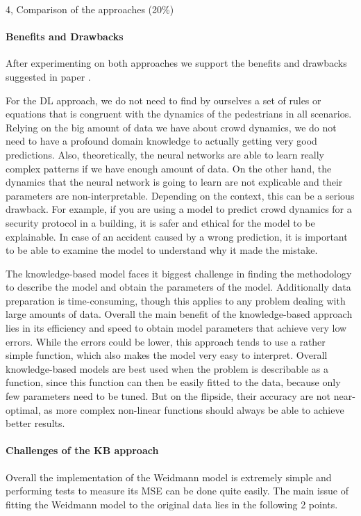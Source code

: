 \begin{task}{4, Comparison of the approaches (20\%)}
\paragraph{Benefits and Drawbacks} After experimenting on both approaches we support the benefits and drawbacks suggested in paper \cite{korbmacher2022review}.

For the DL approach, we do not need to find by ourselves a set of rules or equations that is congruent with the dynamics of the pedestrians in all scenarios. Relying on the big amount of data we have about crowd dynamics, we do not need to have a profound domain knowledge to actually getting very good predictions. Also, theoretically, the neural networks are able to learn really complex patterns if we have enough amount of data. On the other hand, the dynamics that the neural network is going to learn are not explicable and their parameters are non-interpretable. Depending on the context, this can be a serious drawback. For example, if you are using a model to predict crowd dynamics for a security protocol in a building, it is safer and ethical for the model to be explainable. In case of an accident caused by a wrong prediction, it is important to be able to examine the model to understand why it made the mistake.

The knowledge-based model faces it biggest challenge in finding the methodology to describe the model and obtain the parameters of the model. Additionally data preparation is time-consuming, though this applies to any problem dealing with large amounts of data. Overall the main benefit of the knowledge-based approach lies in its efficiency and speed to obtain model parameters that achieve very low errors. While the errors could be lower, this approach tends to use a rather simple function, which also makes the model very easy to interpret. Overall knowledge-based models are best used when the problem is describable as a function, since this function can then be easily fitted to the data, because only few parameters need to be tuned. But on the flipside, their accuracy are not near-optimal, as more complex non-linear functions should always be able to achieve better results.


\paragraph{Challenges of the KB approach} Overall the implementation of the Weidmann model is extremely simple and performing tests to measure its MSE can be done quite easily. The main issue of fitting the Weidmann model to the original data lies in the following 2 points.


\end{task}
